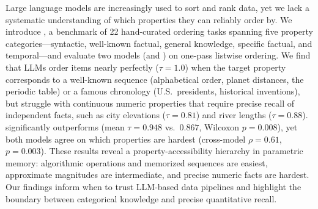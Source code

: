 Large language models are increasingly used to sort and rank data, yet we lack a systematic understanding of which properties they can reliably order by.
We introduce \benchname, a benchmark of 22 hand-curated ordering tasks spanning five property categories---syntactic, well-known factual, general knowledge, specific factual, and temporal---and evaluate two models (\gptlarge and \gptsmall) on one-pass listwise ordering.
We find that LLMs order items nearly perfectly ($\tau = 1.0$) when the target property corresponds to a well-known sequence (alphabetical order, planet distances, the periodic table) or a famous chronology (U.S.\ presidents, historical inventions), but struggle with continuous numeric properties that require precise recall of independent facts, such as city elevations ($\tau = 0.81$) and river lengths ($\tau = 0.88$).
\gptlarge significantly outperforms \gptsmall (mean $\tau = 0.948$ vs.\ $0.867$, Wilcoxon $p = 0.008$), yet both models agree on which properties are hardest (cross-model $\rho = 0.61$, $p = 0.003$).
These results reveal a property-accessibility hierarchy in parametric memory: algorithmic operations and memorized sequences are easiest, approximate magnitudes are intermediate, and precise numeric facts are hardest.
Our findings inform when to trust LLM-based data pipelines and highlight the boundary between categorical knowledge and precise quantitative recall.
